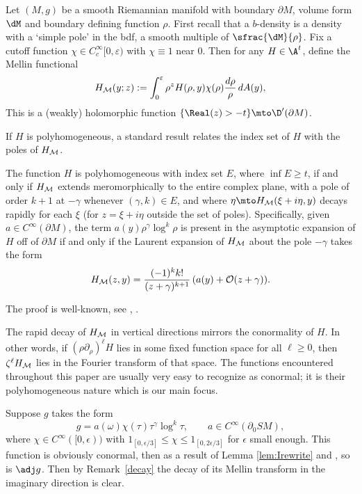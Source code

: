 Let $(M,g)$ be a smooth Riemannian manifold with boundary $\partial M$, volume form $\dM$ and boundary defining function $\rho$. First recall that a $b$-density is a density with a `simple pole' in the bdf, \ie a smooth multiple of $\sfrac{\dM}{\rho}$.
Fix a cutoff function $\chi \in C_c^\infty[0,\varepsilon)$ with $\chi\equiv 1$ near $0$. Then for any $H \in \A^t$, define the Mellin functional
\begin{equation*}
H_{\cal M}(y; z) := \int_0^\varepsilon \rho^z H(\rho,y)\chi(\rho) \frac{d\rho}{\rho}\,dA(y),
\end{equation*}
This is a (weakly) holomorphic function $\{\Real(z)>-t\} \mto \D^\prime (\partial M)$.

If $H$ is polyhomogeneous, a standard result relates the index set of $H$ with the poles of $H_{\cal M}$.
\begin{Lemma}\label{lem:Mellin}
The function $H$ is polyhomogeneous with index set $E$, where $\inf E \geq t$, if and only if $H_{\cal M}$ extends meromorphically to the entire complex plane, with a pole of order $k+1$ at $-\gamma$
whenever $(\gamma,k)\in E$, and where $\eta \mto H_{\cal M}(\xi + i\eta, y)$ decays rapidly for each $\xi$ (for $z = \xi + i\eta$ outside the set of poles). Specifically, given $a\in C^\infty(\partial M)$, the term $a(y) \rho^\gamma \log^k \rho$ is present in the asymptotic expansion of $H$ off of $\partial M$ if and only if the Laurent expansion of $H_{\cal M}$ about the pole $-\gamma$ takes the form
\[
H_{\cal M}(z,y) = \frac{(-1)^k k!}{(z+\gamma)^{k+1}}\, (a(y) + {\cal O} (z+\gamma)).
\]
\end{Lemma}

The proof is well-known, see \cite{Melrose1992}, \cite[App.\,A]{Mazzeo1991}.

\begin{Remark}
The rapid decay of $H_{\cal M}$ in vertical directions mirrors the conormality of $H$. In other words, if $(\rho\partial_\rho)^\ell H$ lies in some
fixed function space for all $\ell \geq 0$, then $\zeta^\ell H_{\cal M}$ lies in the Fourier transform of that space. The functions encountered
throughout this paper are usually very easy to recognize as conormal; it is their polyhomogeneous nature which is our main focus.
\label{decay}
\end{Remark}

 \label{sec:proofbackprojection}
Suppose $g$ takes the form
\begin{equation*}
g = a(\omega) \chi(\tau) \tau^\gamma \log^k \tau, \qquad a\in C^\infty(\partial_0 SM),
\end{equation*}
where $\chi\in C^\infty([0,\epsilon))$ with $1_{[0,\epsilon/3]} \le \chi \le 1_{[0,2\epsilon/3]}$ for $\epsilon$ small enough. This function is obviously conormal, then as a result of Lemma \ref{lem:Irewrite} and \cite[Th.\,3 \& 5]{Melrose1992}, so is $\adj g$. Then by Remark~\ref{decay} the decay of its Mellin transform in the imaginary direction is clear.

